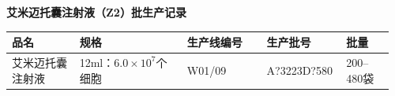 \documentclass[UTF8,10pt,a4paper,fontset=fandol]{ctexart}
\newcommand{\fieldvalue}[1]{#1}
\newcommand{\handwritten}[1]{#1}
\begin{document}
\newpage

\begin{center}
\textbf{艾米迈托囊注射液（Z2）批生产记录}
\end{center}

\begin{tabular}{|p{0.17\linewidth}|p{0.27\linewidth}|p{0.20\linewidth}|p{0.20\linewidth}|p{0.12\linewidth}|}
\hline
品名 & 规格 & 生产线编号 & 生产批号 & 批量 \\
\hline
艾米迈托囊注射液 &
12ml：$6.0\times10^{7}$个细胞 &
\fieldvalue{\handwritten{W01/09}} &
\fieldvalue{\handwritten{A?3223D?580}} &
200--480袋 \\
\hline
\end{tabular}

\vspace{0.5em}
\end{document}
